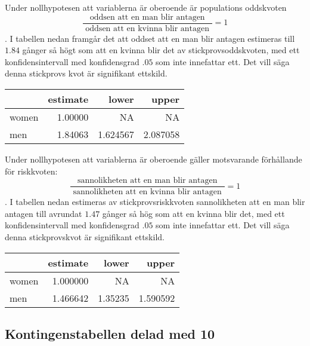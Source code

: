 \documentclass[]{article}
\newenvironment{Shaded}{\begin{snugshade}}{\end{snugshade}}
\newcommand{\KeywordTok}[1]{\textcolor[rgb]{0.13,0.29,0.53}{\textbf{#1}}}
\newcommand{\NormalTok}[1]{#1}
\newcommand{\OperatorTok}[1]{\textcolor[rgb]{0.81,0.36,0.00}{\textbf{#1}}}
\newcommand{\StringTok}[1]{\textcolor[rgb]{0.31,0.60,0.02}{#1}}
\begin{document}
Under nollhypotesen att variablerna är oberoende är populations
oddskvoten
\[\frac{\text{ oddsen att en man blir antagen }}{\text{ oddsen att en kvinna blir antagen }} = 1\].
I tabellen nedan framgår det att oddset att en man blir antagen
estimeras till \(1.84\) gånger så högt som att en kvinna blir det av
stickprovsoddskvoten, med ett konfidensintervall med konfidensgrad
\(.05\) som inte innefattar ett. Det vill säga denna stickprovs kvot är
signifikant ettskild.

\begin{Shaded}
\end{Shaded}

\begin{longtable}[]{@{}lrrr@{}}
\toprule
& estimate & lower & upper\tabularnewline
\midrule
\endhead
women & 1.00000 & NA & NA\tabularnewline
men & 1.84063 & 1.624567 & 2.087058\tabularnewline
\bottomrule
\end{longtable}

Under nollhypotesen att variablerna är oberoende gäller motsvarande
förhållande för riskkvoten:
\[\frac{\text{ sannolikheten att en man blir antagen }}{\text{ sannolikheten att en kvinna blir antagen }} = 1\].
I tabellen nedan estimeras av stickprovsriskkvoten sannolikheten att en
man blir antagen till avrundat \(1.47\) gånger så hög som att en kvinna
blir det, med ett konfidensintervall med konfidensgrad \(.05\) som inte
innefattar ett. Det vill säga denna stickprovskvot är signifikant
ettskild.

\begin{Shaded}
\end{Shaded}

\begin{longtable}[]{@{}lrrr@{}}
\toprule
& estimate & lower & upper\tabularnewline
\midrule
\endhead
women & 1.000000 & NA & NA\tabularnewline
men & 1.466642 & 1.35235 & 1.590592\tabularnewline
\bottomrule
\end{longtable}

\hypertarget{kontingenstabellen-delad-med-10}{%
\subsection{Kontingenstabellen delad med
10}\label{kontingenstabellen-delad-med-10}}
\end{document}
